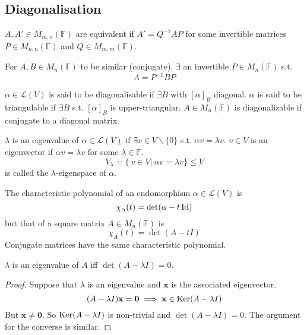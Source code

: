 \documentclass[a4paper]{article}
\begin{document}
\subsection{Diagonalisation}
\begin{defi}
$A,A'\in M_{m,n}(\mathbb{F})$ are equivalent if $A'=Q^{-1}AP$ for some invertible matrices $P\in M_{n,n}(\mathbb{F})$ and $Q\in M_{m,m}(\mathbb{F})$.
\end{defi}
\begin{defi}
For $A,B\in M_n(\mathbb{F})$ to be similar (conjugate), $\exists$ an invertible $P\in M_n(\mathbb{F})$ s.t.
$$A=P^{-1}BP$$
\end{defi}
\begin{defi}
$\alpha\in\mathcal{L}(V)$ is said to be diagonalisable if $\exists B$ with $[\alpha]_B$ diagonal. $\alpha$ is said to be triangulable if $\exists B$ s.t. $[\alpha]_B$ is upper-triangular. $A\in M_n(\mathbb{F})$ is diagonalizable if conjugate to a diagonal matrix.
\end{defi}
\begin{defi}
$\lambda$ is an eigenvalue of $\alpha\in\mathcal{L}(V)$ if $\exists v\in V\backslash\{0\}$ s.t. $\alpha v=\lambda v$. $v\in V$ is an eigenvector if $\alpha v=\lambda v$ for some $\lambda\in\mathbb{F}$. 
$$V_\lambda=\{~v\in V|~\alpha v=\lambda v\}\leq V$$
is called the $\lambda$-eigenspace of $\alpha$. 
\end{defi}
\begin{defi}
The characteristic polynomial of an endomorphism $\alpha\in\mathcal{L}(V)$ is
$$\chi_\alpha(t)=\det(\alpha-t\operatorname{Id})$$
but that of a square matrix $A\in M_n(\mathbb{F})$ is
\begin{equation}
\chi_A(t)=\det(A-tI)\tag{5.4}
\end{equation}
Conjugate matrices have the same characteristic polynomial.
\end{defi}
\begin{thm}
  $\lambda$ is an eigenvalue of $A$ iff $    \det(A - \lambda I) = 0$. 
\end{thm}
\begin{proof}
Suppose that $\lambda$ is an eigenvalue and $\mathbf{x}$ is the associated eigenvector.
  \[
    (A - \lambda I)\mathbf{x} = \mathbf{0}\implies\mathbf{x}\in\operatorname{Ker}(A-\lambda I)
  \]
  But $\mathbf{x}\not= \mathbf{0}$. So $\operatorname{Ker}(A - \lambda I)$ is non-trivial and $\det(A - \lambda I) = 0$. The argument for the converse is similar.
\end{proof}
\end{document}
